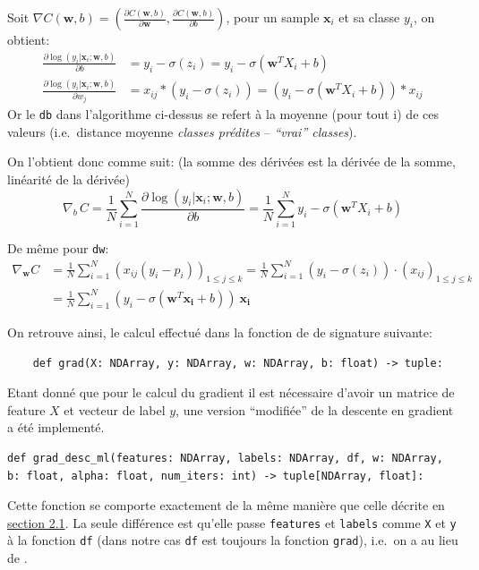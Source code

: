 \documentclass[
]{article}
\begin{document}
Soit
\(\nabla C(\mathbf{w},b) = (\frac{\partial C(\mathbf{w},b)}{\partial \mathbf{w}}, \frac{\partial C(\mathbf{w},b)}{\partial b} )\),
pour un sample \(\mathbf{x}_i\) et sa classe \(y_i\), on obtient:
\begin{align*}
\frac{\partial \log(y_i|\mathbf{x}_i ; \mathbf{w}, b)}{\partial b} 
&= y_i - \sigma(z_i) 
= y_i - \sigma(\mathbf{w}^T X_i + b)\\
%
\frac{\partial \log(y_i|\mathbf{x}_i ; \mathbf{w}, b)}{\partial w_j} 
&= x_{ij}* ( y_i - \sigma(z_i)) 
= (y_i - \sigma(\mathbf{w}^T X_i + b)) * x_{ij}
\end{align*} Or le \texttt{db} dans l'algorithme ci-dessus se refert à
la moyenne (pour tout i) de ces valeurs (i.e.~distance moyenne
\emph{classes prédites} -- \emph{``vrai'' classes}).

On l'obtient donc comme suit: (la somme des dérivées est la dérivée de
la somme, linéarité de la dérivée)
\[\nabla_b\, {C} =\frac{1}{N} \sum_{i = 1}^{N}{ \frac{\partial \log(y_i|\mathbf{x}_i ; \mathbf{w}, b)}{\partial b} =  \frac{1}{N} \sum_{i=1}^N{y_i - \sigma(\mathbf{w}^T X_i + b)}}\]

De même pour \texttt{dw}: \begin{align*}
  \nabla_{\mathbf{w}} C & = \frac{1}{N} \sum_{i = 1}^{N}(x_{ij}(y_i - p_i))_{1 \leq j \leq k} 
  = \frac{1}{N} \sum_{i=1}^N(y_i - \sigma(z_i))\cdot (x_{ij})_{1 \leq j\leq k} \\
%
& =\frac{1}{N}\sum_{i = 1}^N (y_i - \sigma(\mathbf{w}^T\mathbf{x_i} + b))\ \mathbf{x_i}
\end{align*}

On retrouve ainsi, le calcul effectué dans la fonction  de
 de signature suivante:

\begin{lstlisting}
    def grad(X: NDArray, y: NDArray, w: NDArray, b: float) -> tuple:
\end{lstlisting}

Etant donné que pour le calcul du gradient il est nécessaire d'avoir un
matrice de feature \(X\) et vecteur de label \(y\), une version
``modifiée'' de la descente en gradient a été implementé.

\begin{lstlisting}
def grad_desc_ml(features: NDArray, labels: NDArray, df, w: NDArray, b: float, alpha: float, num_iters: int) -> tuple[NDArray, float]:
\end{lstlisting}

Cette fonction se comporte exactement de la même manière que celle
décrite en \href{#gradient-descent}{section 2.1}. La seule différence
est qu'elle passe \texttt{features} et \texttt{labels} comme \texttt{X}
et \texttt{y} à la fonction \texttt{df} (dans notre cas \texttt{df} est
toujours la fonction \texttt{grad}), i.e.~on a
 au lieu de .
\end{document}
